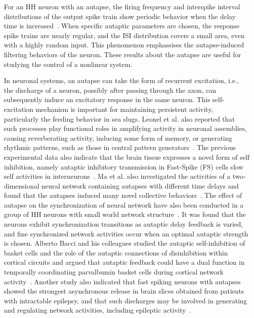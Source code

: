 \documentclass[twocolumn,showpacs,preprintnumbers,amsmath,amssymb,pre,superscriptaddress]{revtex4-1}
\begin{document}
\begin{CJK}{UTF8}{gbsn}
For an HH neuron with an autapse, the firing frequency and interspike interval distributions of the output spike train show periodic behavior when the delay time is increased~\cite{wht_chaos}. When specific autaptic parameters are chosen, the response spike trains are nearly regular, and the ISI distribution covers a small area, even with a highly random input. This phenomenon emphassises the autapse-induced filtering behaviors of the neuron. These results about the autapse are useful for studying the control of a nonlinear system.

In neuronal systems, an autapse can take the form of recurrent excitation, i.e., the discharge of a neuron, possibly after passing through the axon, can subsequently induce an excitatory response in the same neuron. This self-excitation mechanism is important for maintaining persistent activity, particularly the feeding behavior in sea slugs. Leonel et al. also reported that such processes play functional roles in amplifying activity in neuronal assemblies, causing reverberating activity, inducing some form of memory, or generating rhythmic patterns, such as those in central pattern generators~\cite{gomez}. The previous experimental data also indicate that the brain tissue expresses a novel form of self inhibition, namely autaptic inhibitory transmission in Fast-Spike (FS) cells slow self activities in interneurons~\cite{Pawelzik}. Ma et al. also investigated the activities of a two-dimensional neural network containing autapses with different time delays and found that the autapses induced many novel collective behaviors~\cite{majun2}. The effect of autapse on the synchronization of neural network have also been conducted in a group of HH neurons with small world network structure~\cite{wu}. It was found that the neurons exhibit synchronization transitions as autaptic delay feedback is varied, and fine synchronized network activities occur when an optimal autaptic strength is chosen.  
Alberto Bacci and his colleagues studied the autaptic self-inhibition of basket cells and the role of the autaptic connections of disinhibition within cortical circuits and argued that autaptic feedback could have a dual function in temporally coordinating parvalbumin basket cells during cortical network activity~\cite{deleuze}. Another study also indicated that fast spiking neurons with autapses showed the strongest asynchronous release in brain slices obtained from patients with intractable epilepsy, and that such discharges may be involved in generating and regulating network activities, including epileptic activity~\cite{jang}. 



\end{CJK}
\end{document}

